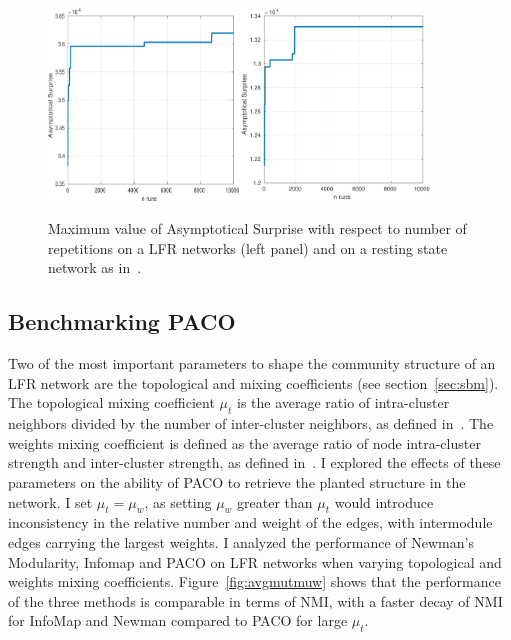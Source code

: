 \noindent\begin{figure}[!htb]
\centering
\includegraphics[width=0.45\textwidth]{images/paco_variability_nreps_lfr.png}\includegraphics[width=0.45\textwidth]{images/paco_variability_nreps_bullmore.png}
\caption{Maximum value of Asymptotical Surprise with respect to number of repetitions on a LFR networks (left panel) and on a resting state network as in~\cite{crossley2013a}.}
\label{fig:paco_variability}
\end{figure}


\subsection{Benchmarking PACO}
Two of the most important parameters to shape the community structure of an LFR network are the topological and mixing coefficients (see section~\ref{sec:sbm}).
The topological mixing coefficient $\mu_t$ is the average ratio of intra-cluster neighbors divided by the number of inter-cluster neighbors, as defined in~\cite{lancichinetti2008}. The weights mixing coefficient is defined as the average ratio of node intra-cluster strength and inter-cluster strength, as defined in~\cite{lancichinetti2009a}.
I explored the effects of these parameters on the ability of PACO to retrieve the planted structure in the network.
I set $\mu_t=\mu_w$, as setting $\mu_w$ greater than $\mu_t$ would introduce inconsistency in the relative number and weight of the edges, with intermodule edges carrying the largest weights.
I analyzed the performance of Newman's Modularity, Infomap and PACO on LFR networks when varying topological and weights mixing coefficients.
Figure~\ref{fig:avgmutmuw} shows that the performance of the three methods is comparable in terms of NMI, with a faster decay of NMI for InfoMap and Newman compared to PACO for large $\mu_t$.

